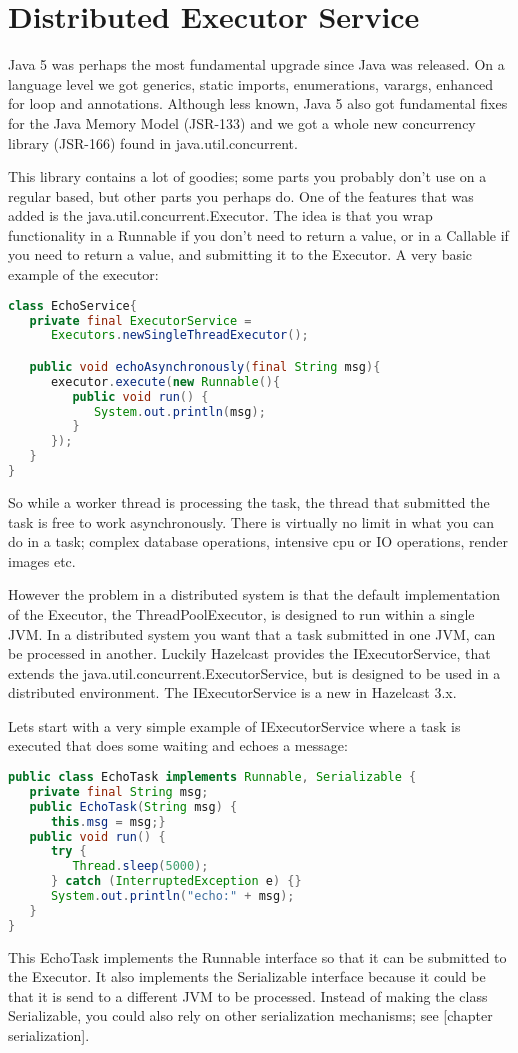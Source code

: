 \chapter{Distributed Executor Service}
Java 5 was perhaps the most fundamental upgrade since Java was released. On a language level we got generics, static imports, enumerations, varargs, enhanced for loop and annotations. Although less known, Java 5 also got fundamental fixes for the Java Memory Model (JSR-133) and we got a whole new concurrency library (JSR-166) found in java.util.concurrent.

This library contains a lot of goodies; some parts you probably don't use on a regular based, but other parts you perhaps do. One of the features that was added is the java.util.concurrent.Executor. The idea is that you wrap functionality in a Runnable if you don't need to return a value, or in a Callable if you need to return a value, and submitting it to the Executor. A very basic example of the executor:
\begin{lstlisting}[language=java]
class EchoService{
   private final ExecutorService = 
      Executors.newSingleThreadExecutor();

   public void echoAsynchronously(final String msg){
      executor.execute(new Runnable(){
         public void run() { 
            System.out.println(msg); 
         }
      });	
   }
}
\end{lstlisting}
So while a worker thread is processing the task, the thread that submitted the task is free to work asynchronously. There is virtually no limit in what you can do in a task; complex database operations, intensive cpu or IO operations, render images etc. 

However the problem in a distributed system is that the default implementation of the Executor, the ThreadPoolExecutor, is designed to run within a single JVM. In a distributed system you want that a task submitted in one JVM, can be processed in another. Luckily Hazelcast provides the IExecutorService, that extends the java.util.concurrent.ExecutorService, but is designed to be used in a distributed environment. The IExecutorService is a new in Hazelcast 3.x.

Lets start with a very simple example of IExecutorService where a task is executed that does some waiting and echoes a message:
\begin{lstlisting}[language=java]
public class EchoTask implements Runnable, Serializable {
   private final String msg;
   public EchoTask(String msg) {
      this.msg = msg;}
   public void run() {
      try { 
         Thread.sleep(5000);
      } catch (InterruptedException e) {}
      System.out.println("echo:" + msg);
   }
}
\end{lstlisting}
This EchoTask implements the Runnable interface so that it can be submitted to the Executor. It also implements the Serializable interface because it could be that it is send to a different JVM to be processed. Instead of making the class Serializable, you could also rely on other serialization mechanisms; see [chapter serialization]. 

